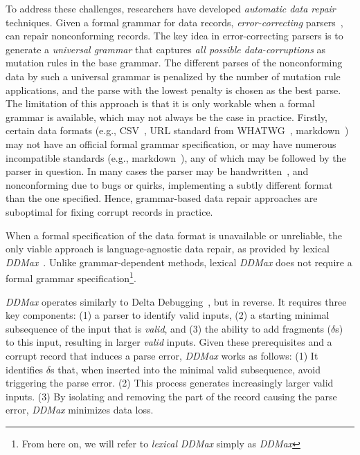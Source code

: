 \documentclass[acmsmall,screen,review,anonymous]{acmart}
\newcommand{\dtask}{data repair\xspace}
\newcommand{\ddmax}{\textit{DDMax}\xspace}
\begin{document}
To address these challenges, researchers have developed \emph{automatic \dtask}
techniques.
Given a formal grammar for data records,
\emph{error-correcting} parsers~\cite{aho1972minimum,diekmann2020dont,parr2011ll}, can
repair nonconforming records.
The key idea in error-correcting parsers is to generate a \emph{universal grammar}
that captures \emph{all possible data-corruptions} as mutation rules
in the base grammar.
The different parses of the nonconforming data by such a universal grammar is
penalized by the number of mutation rule applications, and the parse with the
lowest penalty is chosen as the best parse.
The limitation of this approach is that it is only workable
when a formal grammar is available,
which may not always be the case in practice.
Firstly, certain data formats (e.g., CSV~\cite{taocp},
URL standard from WHATWG~\cite{whatwgurl,urldisagree}, markdown~\cite{gruber2004markdown})
may not have an official formal grammar specification, or may
have numerous incompatible standards
(e.g., markdown~\cite{gruber2004markdown}), any of which may be followed by the
parser in question. In many cases the parser may be handwritten~\cite{uncommongrammars,uncommongrammars2}, and nonconforming due to bugs or quirks,
implementing a subtly different format than the one specified.
Hence, grammar-based \dtask approaches
are suboptimal for fixing corrupt records in practice.



When a formal specification of the data format is unavailable or unreliable,
the only viable approach is language-agnostic \dtask, as provided by lexical
\ddmax~\cite{kirschner2020debugging}. Unlike grammar-dependent methods, lexical
\ddmax does not require a formal grammar specification\footnote{From here on,
we will refer to \emph{lexical} \ddmax simply as \ddmax}.

\ddmax operates similarly to Delta Debugging~\cite{zeller2002simplifying}, but
in reverse. It requires three key components: (1) a parser to identify valid
inputs, (2) a starting minimal subsequence of the input that is \emph{valid},
and (3) the ability to add fragments ($\delta$s) to this input, resulting in
larger \emph{valid} inputs. Given these prerequisites and a corrupt record that
induces a parse error, \ddmax works as follows: (1) It identifies $\delta$s
that, when inserted into the minimal valid subsequence, avoid triggering the
parse error. (2) This process generates increasingly larger valid inputs. (3) By
isolating and removing the part of the record causing the parse error, \ddmax
minimizes data loss.
\end{document}
